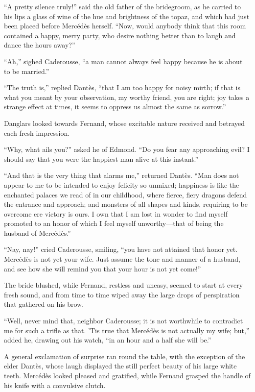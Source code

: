 “A pretty silence truly!” said the old father of the bridegroom, as he
carried to his lips a glass of wine of the hue and brightness of the
topaz, and which had just been placed before Mercédès herself. “Now,
would anybody think that this room contained a happy, merry party, who
desire nothing better than to laugh and dance the hours away?”

“Ah,” sighed Caderousse, “a man cannot always feel happy because he is
about to be married.”

“The truth is,” replied Dantès, “that I am too happy for noisy mirth;
if that is what you meant by your observation, my worthy friend, you
are right; joy takes a strange effect at times, it seems to oppress us
almost the same as sorrow.”

Danglars looked towards Fernand, whose excitable nature received and
betrayed each fresh impression.

“Why, what ails you?” asked he of Edmond. “Do you fear any approaching
evil? I should say that you were the happiest man alive at this
instant.”

“And that is the very thing that alarms me,” returned Dantès. “Man does
not appear to me to be intended to enjoy felicity so unmixed; happiness
is like the enchanted palaces we read of in our childhood, where
fierce, fiery dragons defend the entrance and approach; and monsters of
all shapes and kinds, requiring to be overcome ere victory is ours. I
own that I am lost in wonder to find myself promoted to an honor of
which I feel myself unworthy—that of being the husband of Mercédès.”

“Nay, nay!” cried Caderousse, smiling, “you have not attained that
honor yet. Mercédès is not yet your wife. Just assume the tone and
manner of a husband, and see how she will remind you that your hour is
not yet come!”

The bride blushed, while Fernand, restless and uneasy, seemed to start
at every fresh sound, and from time to time wiped away the large drops
of perspiration that gathered on his brow.

“Well, never mind that, neighbor Caderousse; it is not worthwhile to
contradict me for such a trifle as that. ’Tis true that Mercédès is not
actually my wife; but,” added he, drawing out his watch, “in an hour
and a half she will be.”

A general exclamation of surprise ran round the table, with the
exception of the elder Dantès, whose laugh displayed the still perfect
beauty of his large white teeth. Mercédès looked pleased and gratified,
while Fernand grasped the handle of his knife with a convulsive clutch.

